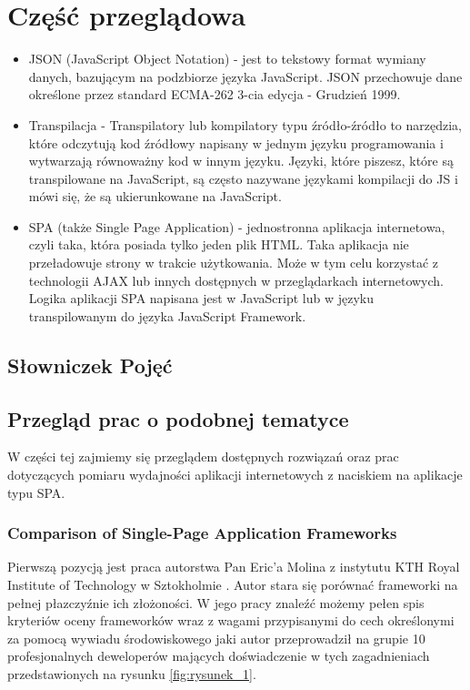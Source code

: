 \chapter{Część przeglądowa}

\begin{itemize}
	\item JSON \cite{JSON} (JavaScript Object Notation) - jest to tekstowy format wymiany danych, bazującym na podzbiorze języka JavaScript. JSON przechowuje dane określone przez standard ECMA-262 3-cia edycja - Grudzień 1999.
	\item Transpilacja \cite{Transpilator} - Transpilatory lub kompilatory typu źródło-źródło to narzędzia, które odczytują kod źródłowy napisany w jednym języku programowania i wytwarzają równoważny kod w innym języku. Języki, które piszesz, które są transpilowane na JavaScript, są często nazywane językami kompilacji do JS i mówi się, że są ukierunkowane na JavaScript.
	\item SPA \cite{SPA} (także Single Page Application) - jednostronna aplikacja internetowa, czyli taka, która posiada tylko jeden plik HTML. Taka aplikacja nie przeładowuje strony w trakcie użytkowania. Może w tym celu korzystać z technologii AJAX lub innych dostępnych w przeglądarkach internetowych. Logika aplikacji SPA napisana jest w JavaScript lub w języku transpilowanym do języka JavaScript Framework.
\end{itemize}


\section{Słowniczek Pojęć}

\section{Przegląd prac o podobnej tematyce}

W części tej zajmiemy się przeglądem dostępnych rozwiązań oraz prac dotyczących pomiaru wydajności aplikacji internetowych z naciskiem na aplikacje typu SPA.

\subsection{Comparison of Single-Page Application Frameworks}

Pierwszą pozycją jest praca autorstwa Pan Eric'a Molina z instytutu KTH Royal Institute of Technology w Sztokholmie \cite{Molin}.
Autor stara się porównać frameworki na pełnej płazczyźnie ich złożoności.
W jego pracy znaleźć możemy pełen spis kryteriów oceny frameworków wraz z wagami przypisanymi do cech określonymi za pomocą wywiadu środowiskowego jaki autor przeprowadził na grupie 10 profesjonalnych deweloperów mających doświadczenie w tych zagadnieniach przedstawionych na rysunku \ref{fig:rysunek_1}.


